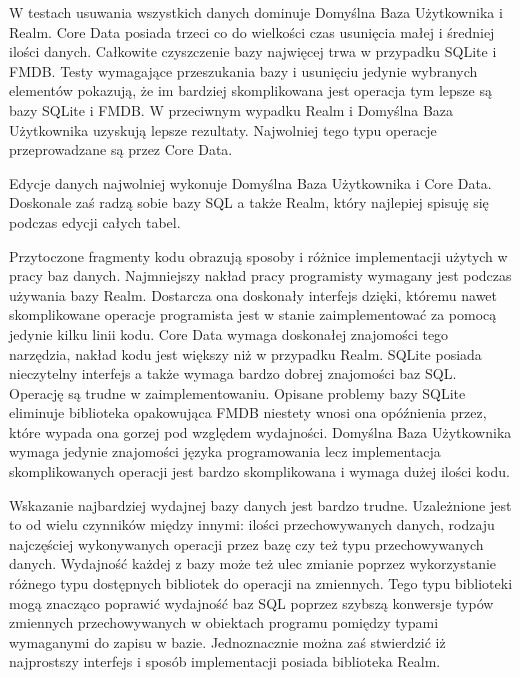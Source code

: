 W testach usuwania wszystkich danych dominuje Domyślna Baza Użytkownika i Realm. Core Data posiada trzeci co do wielkości czas usunięcia małej i średniej ilości danych. Całkowite czyszczenie bazy najwięcej trwa w przypadku SQLite i FMDB.  Testy wymagające przeszukania bazy i usunięciu jedynie wybranych elementów pokazują, że im bardziej skomplikowana jest operacja tym lepsze są bazy SQLite i FMDB. W przeciwnym wypadku Realm i Domyślna Baza Użytkownika uzyskują lepsze rezultaty. Najwolniej tego typu operacje przeprowadzane są przez Core Data. 

Edycje danych najwolniej wykonuje Domyślna Baza Użytkownika i Core Data. Doskonale zaś radzą sobie bazy SQL a także Realm, który najlepiej spisuję się podczas edycji całych tabel. 

Przytoczone fragmenty kodu obrazują sposoby i różnice implementacji użytych w pracy baz danych. Najmniejszy nakład pracy programisty wymagany jest podczas używania bazy Realm. Dostarcza ona doskonały interfejs dzięki, któremu nawet skomplikowane operacje programista jest w stanie zaimplementować za pomocą jedynie kilku linii kodu. Core Data wymaga doskonałej znajomości tego narzędzia, nakład kodu jest większy niż w przypadku Realm. SQLite posiada nieczytelny interfejs a także wymaga bardzo dobrej znajomości baz SQL. Operację są trudne w zaimplementowaniu. Opisane problemy bazy SQLite eliminuje biblioteka opakowująca FMDB niestety wnosi ona opóźnienia przez, które wypada ona gorzej pod względem wydajności. Domyślna Baza Użytkownika wymaga jedynie znajomości języka programowania lecz implementacja skomplikowanych operacji jest bardzo skomplikowana i wymaga dużej ilości kodu. 

Wskazanie najbardziej wydajnej bazy danych jest bardzo trudne. Uzależnione jest to od wielu czynników między innymi: ilości przechowywanych danych, rodzaju najczęściej wykonywanych operacji przez bazę czy też typu przechowywanych danych. Wydajność każdej z bazy może też ulec zmianie poprzez wykorzystanie różnego typu dostępnych bibliotek do operacji na zmiennych. Tego typu biblioteki mogą znacząco poprawić wydajność baz SQL poprzez szybszą konwersje typów zmiennych przechowywanych w obiektach programu pomiędzy typami wymaganymi do zapisu w bazie. Jednoznacznie można zaś stwierdzić iż najprostszy interfejs i sposób implementacji posiada biblioteka Realm.